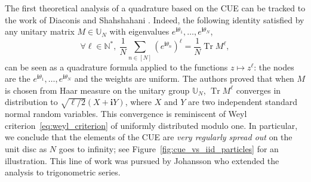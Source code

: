\documentclass[twoside,11pt]{book}
\numberwithin{theorem}{chapter}
\numberwithin{definition}{chapter}
\numberwithin{proposition}{chapter}
\numberwithin{corollary}{chapter}
\numberwithin{example}{chapter}
\numberwithin{lemma}{chapter}
\numberwithin{assumption}{chapter}
\numberwithin{equation}{chapter}
\numberwithin{figure}{chapter}
\DeclareMathOperator{\Tr}{Tr}
\begin{document}





The first theoretical analysis of a  quadrature based on the CUE can be tracked to the work of Diaconis and Shahshahani \citep{DiSh94}. Indeed, the following identity satisfied by any unitary matrix $M \in \mathbb{U}_{N}$ with eigenvalues $e^{\mathbf{i} \theta_{1}}, \dots, e^{\mathbf{i} \theta_{N}}$,
\begin{equation}
\forall \ell \in \mathbb{N}^{*}, \: \frac{1}{N} \sum\limits_{n \in [N]} (e^{\mathbf{i} \theta_{n}})^{\ell} = \frac{1}{N} \Tr M^{\ell},
\end{equation}
can be seen as a quadrature formula applied to the functions $z \mapsto z^{\ell}$: the nodes are the $e^{\mathbf{i} \theta_{1}}, \dots, e^{\mathbf{i} \theta_{N}}$ and the weights are uniform.
  The authors proved that when $M$ is chosen from Haar measure on the unitary group $\mathbb{U}_{N}$, $\Tr M^{\ell} $ converges in distribution to $\sqrt{\ell/2}(X+\mathbf{i} Y)$, where $X$ and $Y$ are two independent standard normal random variables. 
  This convergence is reminiscent of Weyl criterion~\eqref{eq:weyl_criterion} of uniformly distributed modulo one. In particular, we conclude that the elements of the CUE are \emph{very regularly spread out} on the unit disc as $N$ goes to infinity; see Figure~\ref{fig:cue_vs_iid_particles} for an illustration. This line of work was pursued by Johansson who extended the analysis to trigonometric series.
\end{document}
